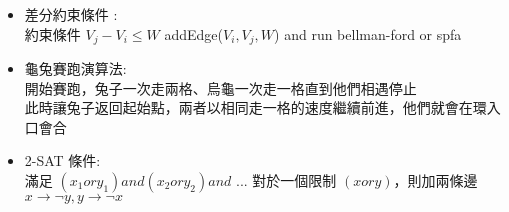 \begin{itemize}
\item 差分約束條件 :\\
  約束條件 $V_j-V_i\le W$ addEdge($V_i, V_j, W $) and run bellman-ford or spfa
\item 龜兔賽跑演算法: \\
  開始賽跑，兔子一次走兩格、烏龜一次走一格直到他們相遇停止\\
  此時讓兔子返回起始點，兩者以相同走一格的速度繼續前進，他們就會在環入口會合
\item 2-SAT 條件: \\
滿足 $(x_{1}  or  y_{1}) and (x_{2}  or  y_{2}) and $ ...
對於一個限制 $(x  or  y)$，則加兩條邊 $x  →  ¬y, y  →  ¬x$
\end{itemize}

